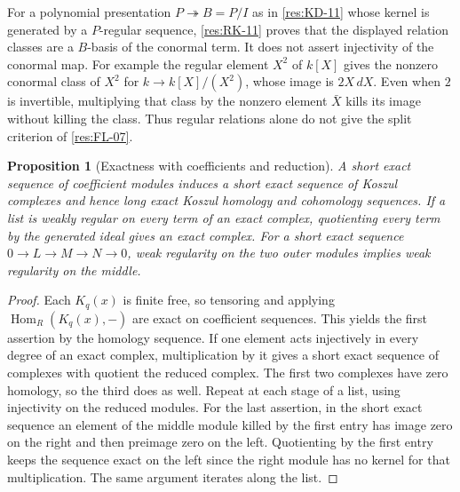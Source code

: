 \documentclass[11pt,oneside,openany]{book}
\newtheorem{proposition}[theorem]{Proposition}
\theoremstyle{definition}
\theoremstyle{remark}
\begin{document}
For a polynomial presentation $P\twoheadrightarrow B=P/I$ as in
\ref{res:KD-11} whose kernel is generated by a $P$-regular sequence,
\ref{res:RK-11} proves that the displayed relation classes are
a $B$-basis of the conormal term. It does not assert injectivity of the
conormal map. For example the regular element $X^2$ of $k[X]$ gives
the nonzero conormal class of $X^2$ for $k\to k[X]/(X^2)$, whose
image is $2X\,dX$. Even when $2$ is invertible, multiplying that
class by the nonzero element $\bar X$ kills its image without
killing the class. Thus regular relations alone do not give the
split criterion of \ref{res:FL-07}.

\begin{proposition}[Exactness with coefficients and reduction]
\label{res:RK-12}
A short exact sequence of coefficient modules induces a short exact
sequence of Koszul complexes and hence long exact Koszul homology
and cohomology sequences. If a list is weakly regular on every
term of an exact complex, quotienting every term by the generated
ideal gives an exact complex. For a short exact sequence
$0\to L\to M\to N\to0$, weak regularity on the two outer
modules implies weak regularity on the middle.
\end{proposition}
\begin{proof}
Each $K_q(x)$ is finite free, so tensoring and applying
$\operatorname{Hom}_R(K_q(x),-)$ are exact on coefficient sequences.
This yields the first assertion by the homology sequence.
If one element acts injectively in every degree of an exact complex,
multiplication by it gives a short exact sequence of complexes with
quotient the reduced complex. The first two complexes have zero
homology, so the third does as well. Repeat at each stage of a
list, using injectivity on the reduced modules.
For the last assertion, in the short exact sequence an element of
the middle module killed by the first entry has image zero on the
right and then preimage zero on the left. Quotienting by the first
entry keeps the sequence exact on the left since the right module
has no kernel for that multiplication. The same argument
iterates along the list.
\end{proof}
\end{document}
